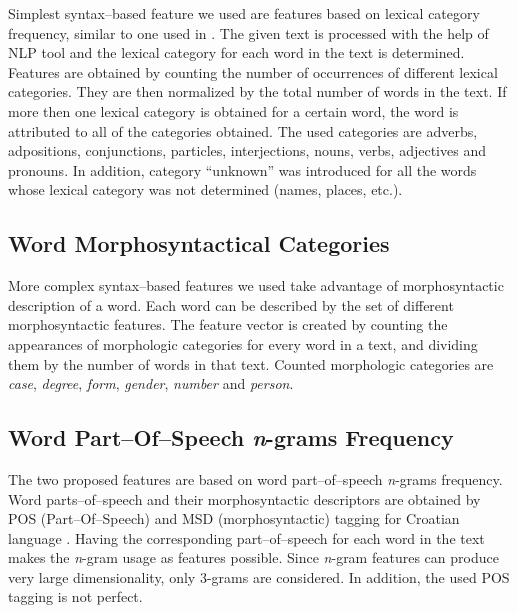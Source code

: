 \documentclass{llncs}
\begin{document}
Simplest syntax--based feature we used are features based on lexical category
frequency, similar to one used in \cite{kukushkina2001using}. The given text is
processed with the help of NLP tool and the lexical
category for each word in the text is determined. Features are obtained by counting the
number of occurrences of different lexical categories. They are then normalized
by the total number of words in the text. If more then one lexical
category is obtained for a certain word, the word is attributed to all of the categories obtained. The used categories
are adverbs, adpositions, conjunctions, particles, interjections, nouns, verbs,
adjectives and pronouns. In addition, category ``unknown'' was introduced for all
the words whose lexical category was not determined (names, places, etc.).

\subsection{Word Morphosyntactical Categories}
\label{sec:morphosyntactic}

More complex syntax--based features we used take advantage of morphosyntactic
description of a word. Each word can be described by the set of different
morphosyntactic features. The feature vector is created by
counting the appearances of morphologic categories for every word in a text, and dividing them by the number of words in
that text. Counted morphologic categories are \emph{case}, \emph{degree},
\emph{form}, \emph{gender}, \emph{number} and \emph{person}.

\subsection{Word Part--Of--Speech \emph{n}-grams Frequency}
\label{sec:ngrami-tipova}
The two proposed features are based on word part--of--speech \emph{n}-grams
frequency. Word parts--of--speech and their morphosyntactic descriptors are obtained by POS
(Part--Of--Speech) and MSD (morphosyntactic) tagging for Croatian language
\cite{snajder08automatic}. Having the corresponding part--of--speech for
each word in the text makes the \emph{n}-gram usage as features
possible. Since \emph{n}-gram features can produce very large dimensionality, 
only 3-grams are considered. In addition, the used POS tagging is not perfect. 
\end{document}
